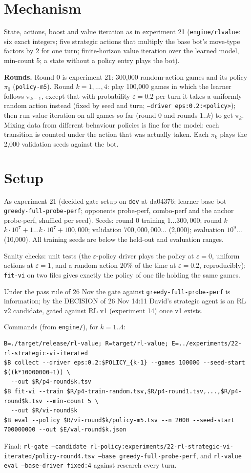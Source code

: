 \documentclass{../polyexp}
\begin{document}
\section{Mechanism}
State, actions, boost and value iteration as in experiment 21 (\texttt{engine/rlvalue}: six exact integers; five
strategic actions that multiply the base bot's move-type factors by 2 for one turn; finite-horizon value iteration
over the learned model, min-count 5; a state without a policy entry plays the bot).

\textbf{Rounds.} Round 0 is experiment 21: 300{,}000 random-action games and its policy $\pi_0$ (\texttt{policy-m5}).
Round $k = 1,\dots,4$: play 100{,}000 games in which the learner follows $\pi_{k-1}$, except that with probability
$\varepsilon = 0.2$ per turn it takes a uniformly random action instead (fixed by seed and turn;
\texttt{--driver eps:0.2:<policy>}); then run value iteration on all games so far (round 0 and rounds $1..k$) to get
$\pi_k$. Mixing data from different behaviour policies is fine for the model: each transition is counted under the
action that was actually taken. Each $\pi_k$ plays the 2{,}000 validation seeds against the bot.

\section{Setup}
As experiment 21 (decided gate setup on \texttt{dev} at da04376; learner base bot \texttt{greedy-full-probe-perf};
opponents probe-perf, combo-perf and the anchor probe-perf, shuffled per seed). Seeds: round 0 training
$1\dots300{,}000$; round $k$ $k\cdot10^7+1 \dots k\cdot10^7+100{,}000$; validation $700{,}000{,}000\dots$ (2{,}000);
evaluation $10^9\dots$ (10{,}000). All training seeds are below the held-out and evaluation ranges.

Sanity checks: unit tests (the $\varepsilon$-policy driver plays the policy at $\varepsilon = 0$, uniform actions at
$\varepsilon = 1$, and a random action 20\% of the time at $\varepsilon = 0.2$, reproducibly); \texttt{fit-vi} on two
files gives exactly the policy of one file holding the same games.

Under the pass rule of 26 Nov the gate against \texttt{greedy-full-probe-perf} is information; by the DECISION of
26 Nov 14:11 David's strategic agent is an RL v2 candidate, gated against RL v1 (experiment 14) once v1 exists.

Commands (from \texttt{engine/}), for $k = 1..4$:
\begin{verbatim}
B=./target/release/rl-value; R=target/rl-value; E=../experiments/22-rl-strategic-vi-iterated
$B collect --driver eps:0.2:$POLICY_{k-1} --games 100000 --seed-start $((k*10000000+1)) \
  --out $R/p4-round$k.tsv
$B fit-vi --train $R/p4-train-random.tsv,$R/p4-round1.tsv,...,$R/p4-round$k.tsv --min-count 5 \
  --out $R/vi-round$k
$B eval --policy $R/vi-round$k/policy-m5.tsv --n 2000 --seed-start 700000000 --out $E/val-round$k.json
\end{verbatim}
Final: \texttt{rl-gate --candidate rl-policy:experiments/22-rl-strategic-vi-iterated/policy-round4.tsv --base
greedy-full-probe-perf}, and \texttt{rl-value eval --base-driver fixed:4} against research every turn.
\end{document}
